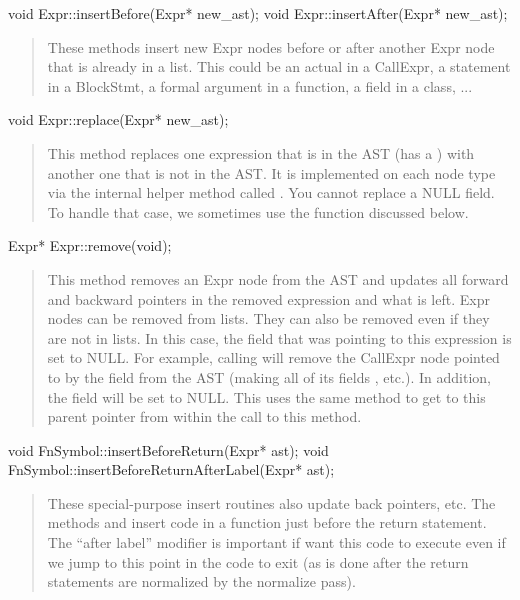 \documentclass[10pt]{article}
\begin{document}
\begin{clang}
void Expr::insertBefore(Expr* new_ast);
void Expr::insertAfter(Expr* new_ast);
\end{clang}
\begin{quote}
These methods insert new Expr nodes before or after another Expr node
that is already in a list.  This could be an actual in a CallExpr, a
statement in a BlockStmt, a formal argument in a function, a field in
a class, ...
\end{quote}

\begin{clang}
void Expr::replace(Expr* new_ast);
\end{clang}
\begin{quote}
This method replaces one expression that is in the AST (has a
) with another one that is not in the AST.  It is
implemented on each node type via the internal helper method called
.  You cannot replace a NULL field.  To handle
that case, we sometimes use the  function discussed
below.
\end{quote}

\begin{clang}
Expr* Expr::remove(void);
\end{clang}
\begin{quote}
This method removes an Expr node from the AST and updates all forward
and backward pointers in the removed expression and what is left.
Expr nodes can be removed from lists.  They can also be removed even
if they are not in lists.  In this case, the field that was pointing
to this expression is set to NULL.  For example, calling
 will remove the CallExpr node pointed
to by the  field from the AST (making all of its
 fields , etc.).  In addition, the
 field will be set to NULL.  This uses the same
 method to get to this parent pointer from within the
call to this method.
\end{quote}

\begin{clang}
void FnSymbol::insertBeforeReturn(Expr* ast);
void FnSymbol::insertBeforeReturnAfterLabel(Expr* ast);
\end{clang}
\begin{quote}
These special-purpose insert routines also update back pointers, etc.
The methods  and
 insert code in a function just
before the return statement.  The ``after label'' modifier is
important if want this code to execute even if we jump to this point
in the code to exit (as is done after the return statements are
normalized by the normalize pass).
\end{quote}
\end{document}

